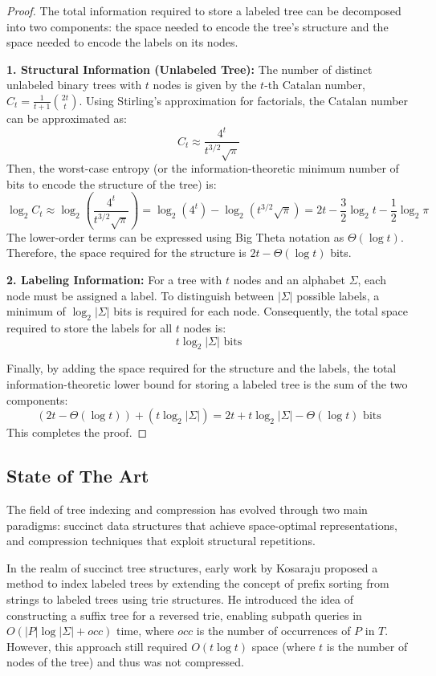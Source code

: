 \begin{proof}
The total information required to store a labeled tree can be decomposed into two components: the space needed to encode the tree's structure and the space needed to encode the labels on its nodes.

\textbf{1. Structural Information (Unlabeled Tree):}
The number of distinct unlabeled binary trees with $t$ nodes is given by the $t$-th Catalan number, $C_t = \frac{1}{t+1} \binom{2t}{t}$. Using Stirling's approximation for factorials, the Catalan number can be approximated as:
$$C_t \approx \frac{4^t}{t^{3/2}\sqrt{\pi}}$$
Then, the worst-case entropy (or the information-theoretic minimum number of bits to encode
the structure of the tree) is:
$$\log_2 C_t \approx \log_2\left(\frac{4^t}{t^{3/2}\sqrt{\pi}}\right) = \log_2(4^t) - \log_2(t^{3/2}\sqrt{\pi}) = 2t - \frac{3}{2}\log_2 t - \frac{1}{2}\log_2 \pi$$
The lower-order terms can be expressed using Big Theta notation as $\Theta(\log t)$. Therefore, the space required for the structure is $2t - \Theta(\log t)$ bits.

\textbf{2. Labeling Information:}
For a tree with $t$ nodes and an alphabet $\Sigma$, each node must be assigned a label. To distinguish between $|\Sigma|$ possible labels, a minimum of $\log_2 |\Sigma|$ bits is required for each node. Consequently, the total space required to store the labels for all $t$ nodes is:
$$t \log_2 |\Sigma| \text{ bits}$$

Finally, by adding the space required for the structure and the labels, the total information-theoretic lower bound for storing a labeled tree is the sum of the two components:
$$ (2t - \Theta(\log t)) + (t \log_2 |\Sigma|) = 2t + t \log_2 |\Sigma| - \Theta(\log t) \text{ bits} $$
This completes the proof.
\end{proof}


\subsection{State of The Art} \label{sec:background}
The field of tree indexing and compression has evolved through two main paradigms: succinct data structures that achieve space-optimal representations, and compression techniques that exploit structural repetitions.

In the realm of succinct tree structures, early work by Kosaraju \cite{kosaraju1989efficient} proposed a method to index labeled trees by extending the concept of prefix sorting from strings to labeled trees using trie structures. He introduced the idea of constructing a suffix tree for a reversed trie, enabling subpath queries in $O(|P|\log|\Sigma|+ occ)$ time, where $occ$ is the number of occurrences of $P$ in $T$. However, this approach still required $O(t \log t)$ space (where $t$ is the number of nodes of the tree) and thus was not compressed.

